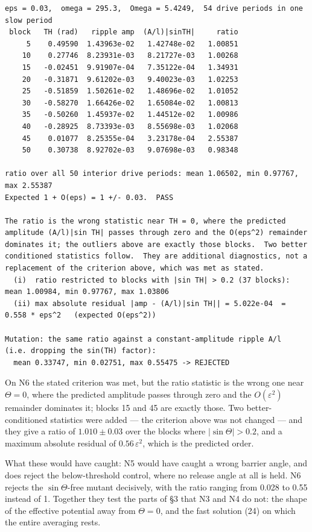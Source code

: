 \documentclass[11pt,a4paper]{article}
\begin{document}
\begin{lstlisting}
eps = 0.03,  omega = 295.3,  Omega = 5.4249,  54 drive periods in one slow period
 block   TH (rad)   ripple amp  (A/l)|sinTH|     ratio
     5    0.49590  1.43963e-02   1.42748e-02   1.00851
    10    0.27746  8.23931e-03   8.21727e-03   1.00268
    15   -0.02451  9.91907e-04   7.35122e-04   1.34931
    20   -0.31871  9.61202e-03   9.40023e-03   1.02253
    25   -0.51859  1.50261e-02   1.48696e-02   1.01052
    30   -0.58270  1.66426e-02   1.65084e-02   1.00813
    35   -0.50260  1.45937e-02   1.44512e-02   1.00986
    40   -0.28925  8.73393e-03   8.55698e-03   1.02068
    45    0.01077  8.25355e-04   3.23178e-04   2.55387
    50    0.30738  8.92702e-03   9.07698e-03   0.98348

ratio over all 50 interior drive periods: mean 1.06502, min 0.97767, max 2.55387
Expected 1 + O(eps) = 1 +/- 0.03.  PASS

The ratio is the wrong statistic near TH = 0, where the predicted
amplitude (A/l)|sin TH| passes through zero and the O(eps^2) remainder
dominates it; the outliers above are exactly those blocks.  Two better
conditioned statistics follow.  They are additional diagnostics, not a
replacement of the criterion above, which was met as stated.
  (i)  ratio restricted to blocks with |sin TH| > 0.2 (37 blocks): mean 1.00984, min 0.97767, max 1.03806
  (ii) max absolute residual |amp - (A/l)|sin TH|| = 5.022e-04  = 0.558 * eps^2   (expected O(eps^2))

Mutation: the same ratio against a constant-amplitude ripple A/l
(i.e. dropping the sin(TH) factor):
  mean 0.33747, min 0.02751, max 0.55475 -> REJECTED
\end{lstlisting}

On N6 the stated criterion was met, but the ratio statistic is the wrong one
near \(\Theta=0\), where the predicted amplitude passes through zero and the
\(O(\varepsilon^2)\) remainder dominates it; blocks 15 and 45 are exactly those.
Two better-conditioned statistics were added --- the criterion above was not
changed --- and they give a ratio of \(1.010\pm0.03\) over the blocks where
\(|\sin\Theta|>0.2\), and a maximum absolute residual of \(0.56\,\varepsilon^2\),
which is the predicted order.

What these would have caught: N5 would have caught a wrong barrier angle, and
does reject the below-threshold control, where no release angle at all is held.
N6 rejects the \(\sin\Theta\)-free mutant decisively, with the ratio ranging from
0.028 to 0.55 instead of 1. Together they test the parts of §3 that N3 and N4 do
not: the shape of the effective potential away from \(\Theta=0\), and the fast
solution (24) on which the entire averaging rests.
\end{document}
